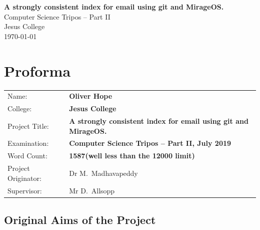 \documentclass[12pt,a4paper,twoside,openright]{report}
\begin{document}





\pagestyle{empty}


\vspace*{60mm}
\begin{center}
\Huge
\textbf{A strongly consistent index for email using git and MirageOS.} \\[5mm]
Computer Science Tripos -- Part II \\[5mm]
Jesus College \\[5mm]
\today  %
\end{center}


\pagestyle{plain}

\chapter*{Proforma}

{\large
\begin{tabular}{ll}
Name:               & \bf Oliver Hope \\
College:            & \bf Jesus College                     \\
Project Title:      & \bf A strongly consistent index for email using git and MirageOS. \\
Examination:        & \bf Computer Science Tripos -- Part II, July 2019  \\
Word Count:         & \bf 1587\footnotemark[1]
                      (well less than the 12000 limit)  \\
Project Originator: & Dr M.~Madhavapeddy                    \\
Supervisor:         & Mr D.~Allsopp                    \\
\end{tabular}
}


\section*{Original Aims of the Project}
\end{document}
